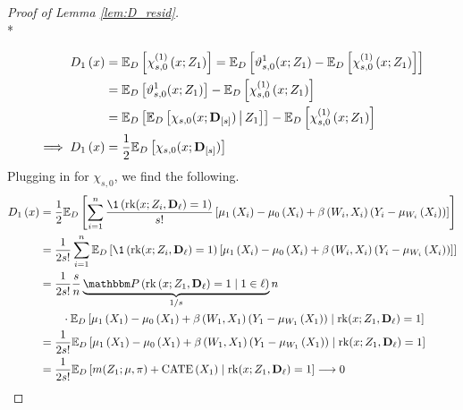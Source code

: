 \begin{proof}[Proof of Lemma \ref{lem:D_resid}]\mbox{}\\*

    \begin{equation}
        \begin{aligned}
            D_{1}\left(x\right)
            & = \mathbb{E}_{D}\left[\chi_{s,0}^{(1)}\left(x; Z_{1}\right)\right] 
            = \mathbb{E}_{D}\left[\vartheta_{s,0}^{1}(x; Z_1) - \mathbb{E}_{D}\left[\chi_{s,0}^{(1)}\left(x; Z_{1}\right)\right]\right] \\
            & = \mathbb{E}_{D}\left[\vartheta_{s,0}^{1}(x; Z_1)\right] - \mathbb{E}_{D}\left[\chi_{s,0}^{(1)}\left(x; Z_{1}\right)\right] \\
            & = \mathbb{E}_{D}\left[\mathbb{E}_{D}\left[\chi_{s,0}(x; \mathbf{D}_{[s]}) \, \middle| \, Z_1 \right]\right]
            - \mathbb{E}_{D}\left[\chi_{s,0}^{(1)}\left(x; Z_{1}\right)\right] \\
            \implies D_{1}\left(x\right)
            & = \frac{1}{2} \mathbb{E}_{D}\left[\chi_{s,0}(x; \mathbf{D}_{[s]})\right]
        \end{aligned}
    \end{equation}
    Plugging in for $\chi_{s,0}$, we find the following.
    \begin{equation}
        \begin{aligned}
            D_{1}\left(x\right)
            & = \frac{1}{2} \E_{D}\left[\sum_{i = 1}^{n}\frac{\1\left(\rk(x; Z_{i}, \mathbf{D}_{\ell}) = 1\right)}{s!} 
            \left[\mu_{1}\left(X_{i}\right) - \mu_{0}\left(X_{i}\right) + \beta\left(W_{i}, X_{i}\right)\left(Y_{i} - \mu_{W_{i}}\left(X_{i}\right)\right)\right]\right] \\
            & = \frac{1}{2s!}\sum_{i = 1}^{n}\E_{D}\left[\1\left(\rk(x; Z_{i}, \mathbf{D}_{\ell}) = 1\right)
            \left[\mu_{1}\left(X_{i}\right) - \mu_{0}\left(X_{i}\right) + \beta\left(W_{i}, X_{i}\right)\left(Y_{i} - \mu_{W_{i}}\left(X_{i}\right)\right)\right]\right] \\
            & = \frac{1}{2s!}
            \frac{s}{n}
            \underbrace{\P\left(\operatorname{rk}\left(x; Z_1, \mathbf{D}_{\ell}\right) = 1 \; \middle| \; 1 \in \ell \right)}_{1/s}
            n \\
            & \quad \quad \cdot \E_{D}\left[
            \mu_{1}\left(X_{1}\right) - \mu_{0}\left(X_{1}\right) + \beta\left(W_{1}, X_{1}\right)\left(Y_{1} - \mu_{W_{1}}\left(X_{1}\right)\right) \; \middle| \; \operatorname{rk}(x; Z_1, \mathbf{D}_{\ell}) = 1\right] \\
            & = \frac{1}{2s!}\E_{D}\left[
            \mu_{1}\left(X_{1}\right) - \mu_{0}\left(X_{1}\right) + \beta\left(W_{1}, X_{1}\right)\left(Y_{1} - \mu_{W_{1}}\left(X_{1}\right)\right)\; \middle| \; \operatorname{rk}(x; Z_1, \mathbf{D}_{\ell}) = 1\right]\\
            & = \frac{1}{2s!}\E_{D}\left[m(Z_1; \mu, \pi) + \operatorname{CATE}\left(X_1\right) \; \middle| \; \operatorname{rk}(x; Z_1, \mathbf{D}_{\ell}) = 1\right]
            \longrightarrow 0
        \end{aligned}
    \end{equation}


\end{proof}
